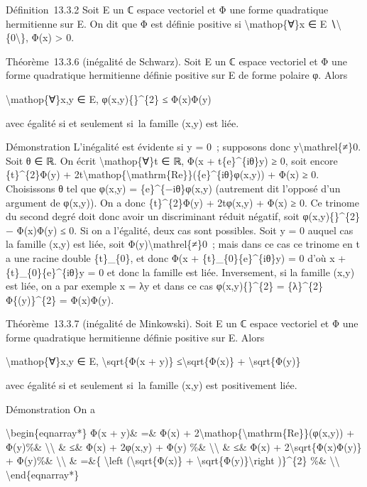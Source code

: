 \documentclass[]{article}
\begin{document}
Définition~13.3.2 Soit E un ℂ espace vectoriel et Φ une forme
quadratique hermitienne sur E. On dit que Φ est définie positive si
\textbackslash{}mathop\{∀\}x ∈ E ∖\textbackslash{}\{0\textbackslash{}\},
Φ(x) \textgreater{} 0.

Théorème~13.3.6 (inégalité de Schwarz). Soit E un ℂ espace vectoriel et
Φ une forme quadratique hermitienne définie positive sur E de forme
polaire φ. Alors

\textbackslash{}mathop\{∀\}x,y ∈ E,
\textbar{}φ(x,y)\{\textbar{}\}\^{}\{2\} ≤ Φ(x)Φ(y)

avec égalité si et seulement si~la famille (x,y) est liée.

Démonstration L'inégalité est évidente si y = 0~; supposons donc
y\textbackslash{}mathrel\{≠\}0. Soit θ ∈ ℝ. On écrit
\textbackslash{}mathop\{∀\}t ∈ ℝ, Φ(x + t\{e\}\^{}\{iθ\}y) ≥ 0, soit
encore \{t\}\^{}\{2\}Φ(y) +
2t\textbackslash{}mathop\{\textbackslash{}mathrm\{Re\}\}(\{e\}\^{}\{iθ\}φ(x,y))
+ Φ(x) ≥ 0. Choisissons θ tel que φ(x,y) =
\{e\}\^{}\{−iθ\}\textbar{}φ(x,y)\textbar{} (autrement dit l'opposé d'un
argument de φ(x,y)). On a donc \{t\}\^{}\{2\}Φ(y) +
2t\textbar{}φ(x,y)\textbar{} + Φ(x) ≥ 0. Ce trinome du second degré doit
donc avoir un discriminant réduit négatif, soit
\textbar{}φ(x,y)\{\textbar{}\}\^{}\{2\} − Φ(x)Φ(y) ≤ 0. Si on a
l'égalité, deux cas sont possibles. Soit y = 0 auquel cas la famille
(x,y) est liée, soit Φ(y)\textbackslash{}mathrel\{≠\}0~; mais dans ce
cas ce trinome en t a une racine double \{t\}\_\{0\}, et donc Φ(x +
\{t\}\_\{0\}\{e\}\^{}\{iθ\}y) = 0 d'où x + \{t\}\_\{0\}\{e\}\^{}\{iθ\}y
= 0 et donc la famille est liée. Inversement, si la famille (x,y) est
liée, on a par exemple x = λy et dans ce cas
\textbar{}φ(x,y)\{\textbar{}\}\^{}\{2\} =
\textbar{}\{λ\}\^{}\{2\}\textbar{}Φ\{(y)\}\^{}\{2\} = Φ(x)Φ(y).

Théorème~13.3.7 (inégalité de Minkowski). Soit E un ℂ espace vectoriel
et Φ une forme quadratique hermitienne définie positive sur E. Alors

\textbackslash{}mathop\{∀\}x,y ∈ E, \textbackslash{}sqrt\{Φ(x + y)\}
≤\textbackslash{}sqrt\{Φ(x)\} + \textbackslash{}sqrt\{Φ(y)\}

avec égalité si et seulement si~la famille (x,y) est positivement liée.

Démonstration On a

\textbackslash{}begin\{eqnarray*\} Φ(x + y)\& =\& Φ(x) +
2\textbackslash{}mathop\{\textbackslash{}mathrm\{Re\}\}(φ(x,y)) +
Φ(y)\%\& \textbackslash{}\textbackslash{} \& ≤\& Φ(x) +
2\textbar{}φ(x,y)\textbar{} + Φ(y) \%\& \textbackslash{}\textbackslash{}
\& ≤\& Φ(x) + 2\textbackslash{}sqrt\{Φ(x)Φ(y)\} + Φ(y)\%\&
\textbackslash{}\textbackslash{} \& =\&\{ \textbackslash{}left
(\textbackslash{}sqrt\{Φ(x)\} +
\textbackslash{}sqrt\{Φ(y)\}\textbackslash{}right )\}\^{}\{2\} \%\&
\textbackslash{}\textbackslash{} \textbackslash{}end\{eqnarray*\}
\end{document}
